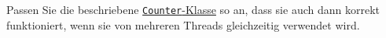 \label{nebelaufigkeit03}
Passen Sie die beschriebene \hyperref[threads:lst:counter_example]{\lstinline$Counter$-Klasse} so an, 
dass sie auch dann korrekt funktioniert, wenn sie von mehreren Threads gleichzeitig verwendet wird.